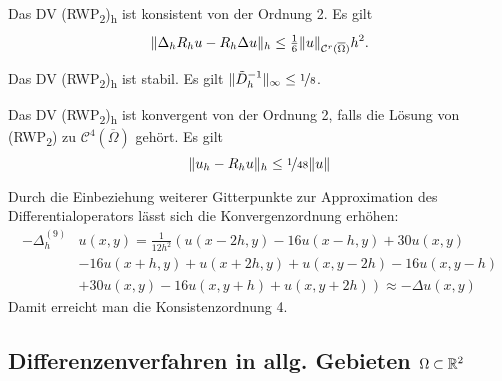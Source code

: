 \documentclass{cheat-sheet}
\newcommand{\Cont}{\mathcal{C}} %
\newcommand{\clos}[1]{\overline{#1}} %
\newcommand{\cOmega}{\clos{\Omega}} %
\newcommand{\Laplace}{\Delta}
\newcommand{\tss}[1]{\textsubscript{#1}} %
\begin{document}

\begin{lem}
  Das DV (RWP\tss{2})\tss{h} ist konsistent von der Ordnung 2.
  Es gilt
  \[ \norm{\Laplace_h R_h u - R_h \Laplace u}_h \leq \tfrac{1}{6} \norm{u}_{\Cont^r(\cOmega)} h^2. \]
\end{lem}

\begin{lem}
  Das DV (RWP\tss{2})\tss{h} ist stabil.
  Es gilt $\lVert\tilde{D}_h^{-1}\rVert_\infty \leq \nicefrac{1}{8}$.
\end{lem}


\begin{satz}
  Das DV (RWP\tss{2})\tss{h} ist konvergent von der Ordnung 2, falls die Lösung von (RWP\tss{2}) zu $\Cont^4(\cOmega)$ gehört.
  Es gilt
  \[ \lVert u_h - R_h u\rVert_h \leq \nicefrac{1}{48} \lVert u\rVert \]
\end{satz}

\begin{bem}
  Durch die Einbeziehung weiterer Gitterpunkte zur Approximation des Differentialoperators lässt sich die Konvergenzordnung erhöhen:
  \begin{align*}
    - \Laplace_h^{(9)} & u(x, y) = \tfrac{1}{12 h^2} \left( u(x{-}2h, y) - 16 u(x{-}h, y) + 30 u(x, y) \right. \\
    & \left. - 16 u(x{+}h, y) + u(x{+}2h, y) + u(x, y{-}2h) - 16 u(x, y{-}h) \right. \\
    & \left. + 30 u(x, y) - 16 u(x, y{+}h) + u(x, y{+}2h) \right) \approx - \Laplace u(x, y)
  \end{align*}
  Damit erreicht man die Konsistenzordnung 4.
\end{bem}

\subsection{Differenzenverfahren in allg. Gebieten $\Omega \subset \mathbb{R}^2$}
\end{document}
